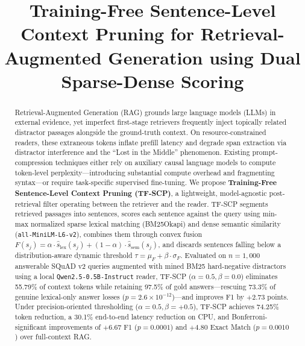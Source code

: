 \documentclass[conference]{IEEEtran}
\begin{document}
\title{Training-Free Sentence-Level Context Pruning for Retrieval-Augmented Generation using Dual Sparse-Dense Scoring}

\author{
}

\maketitle

\begin{abstract}
Retrieval-Augmented Generation (RAG) grounds large language models (LLMs) in external evidence, yet imperfect first-stage retrievers frequently inject topically related distractor passages alongside the ground-truth context. On resource-constrained readers, these extraneous tokens inflate prefill latency and degrade span extraction via distractor interference and the ``Lost in the Middle'' phenomenon. Existing prompt-compression techniques either rely on auxiliary causal language models to compute token-level perplexity---introducing substantial compute overhead and fragmenting syntax---or require task-specific supervised fine-tuning. We propose \textbf{Training-Free Sentence-Level Context Pruning (TF-SCP)}, a lightweight, model-agnostic post-retrieval filter operating between the retriever and the reader. TF-SCP segments retrieved passages into sentences, scores each sentence against the query using min-max normalized sparse lexical matching (BM25Okapi) and dense semantic similarity (\texttt{all-MiniLM-L6-v2}), combines them through convex fusion $F(s_j) = \alpha \cdot \hat{s}_{\mathrm{lex}}(s_j) + (1 - \alpha) \cdot \hat{s}_{\mathrm{sem}}(s_j)$, and discards sentences falling below a distribution-aware dynamic threshold $\tau = \mu_F + \beta \cdot \sigma_F$. Evaluated on $n=1,000$ answerable SQuAD v2 queries augmented with mined BM25 hard-negative distractors using a local \texttt{Qwen2.5-0.5B-Instruct} reader, TF-SCP ($\alpha=0.5, \beta=0.0$) eliminates 55.79\% of context tokens while retaining 97.5\% of gold answers---rescuing 73.3\% of genuine lexical-only answer losses ($p = 2.6 \times 10^{-12}$)---and improves F1 by $+2.73$ points. Under precision-oriented thresholding ($\alpha=0.5, \beta=+0.5$), TF-SCP achieves 74.25\% token reduction, a 30.1\% end-to-end latency reduction on CPU, and Bonferroni-significant improvements of $+6.67$ F1 ($p = 0.0001$) and $+4.80$ Exact Match ($p = 0.0010$) over full-context RAG.
\end{abstract}
\end{document}
